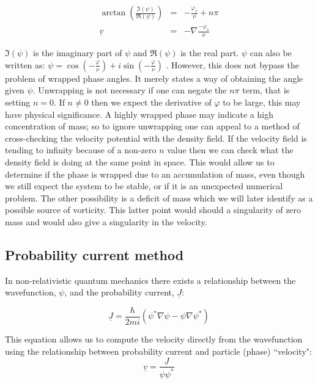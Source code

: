 \begin{eqnarray}
\arctan\left(\frac{\Im(\psi)}{\Re(\psi)}\right)&=& -\frac{\varphi_{v}}{\nu}  + n \pi \\
\underline{v} &=& -\nabla \frac{-\varphi_v}{\nu}
\end{eqnarray}

\noindent $\Im(\psi)$ is the imaginary part of $\psi$ and $\Re(\psi)$ is the real part. $\psi$ can also be written as: $\psi = \cos(-\frac{\varphi}{\nu}) + i \sin(-\frac{\varphi}{\nu})$ . However, this does not bypass the problem of wrapped phase angles. It merely states a way of obtaining the angle given $\psi$. Unwrapping is not necessary if one can negate the $n \pi$ term, that is setting $n=0$. If $n \neq 0$ then we expect the derivative of $\varphi$ to be large, this may have physical significance. A highly wrapped phase may indicate a high concentration of mass; so to ignore unwrapping one can appeal to a method of cross-checking the velocity potential with the density field. If the velocity field is tending to infinity because of a non-zero $n$ value then we can check what the density field is doing at the same point in space. This would allow us to determine if the phase is wrapped due to an accumulation of mass, even though we still expect the system to be stable, or if it is an unexpected numerical problem. The other possibility is a deficit of mass which we will later identify as a possible source of vorticity. This latter point would should a singularity of zero mass and would also give a singularity in the velocity.

\subsection{Probability current method}
\label{sec_j}
In non-relativistic quantum mechanics there exists a relationship between the wavefunction, $\psi$, and the probability current, $\underline{J}$:

\begin{equation}
\label{eqn_j}
 \underline{J} = \frac{\hbar}{2mi} (\psi^* \nabla \psi - \psi \nabla \psi^*)
\end{equation}

\noindent This equation allows us to compute the velocity directly from the wavefunction using the relationship between probability current and particle (phase) ``velocity":
\begin{equation}
\label{eqn_vj}
\underline{v} = \frac{\underline{J}}{\psi\psi^*}
\end{equation}

